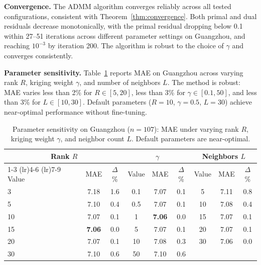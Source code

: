 \documentclass[journal]{IEEEtran}
\begin{document}
\textbf{Convergence.}
The ADMM algorithm converges reliably across all tested configurations, consistent with Theorem~\ref{thm:convergence}. Both primal and dual residuals decrease monotonically, with the primal residual dropping below 0.1 within 27--51 iterations across different parameter settings on Guangzhou, and reaching $10^{-3}$ by iteration 200. The algorithm is robust to the choice of $\gamma$ and converges consistently.

\textbf{Parameter sensitivity.}
Table~\ref{tab:sensitivity} reports MAE on Guangzhou across varying rank $R$, kriging weight $\gamma$, and number of neighbors $L$. The method is robust: MAE varies less than 2\% for $R \in [5, 20]$, less than 3\% for $\gamma \in [0.1, 50]$, and less than 3\% for $L \in [10, 30]$. Default parameters ($R = 10$, $\gamma = 0.5$, $L = 30$) achieve near-optimal performance without fine-tuning.

\begin{table}[htbp]
  \centering
  \caption{Parameter sensitivity on Guangzhou ($n{=}107$): MAE under varying rank $R$, kriging weight $\gamma$, and neighbor count $L$. Default parameters are near-optimal.}
  \label{tab:sensitivity}
  \small
  \setlength{\tabcolsep}{4pt}
  \begin{tabular}{lcccccccc}
    \toprule
    \multicolumn{3}{c}{Rank $R$} & \multicolumn{3}{c}{$\gamma$} & \multicolumn{3}{c}{Neighbors $L$} \\
    \cmidrule(lr){1-3} \cmidrule(lr){4-6} \cmidrule(lr){7-9}
    Value & MAE & $\Delta$\% & Value & MAE & $\Delta$\% & Value & MAE & $\Delta$\% \\
    \midrule
    3  & 7.18 & 1.6  & 0.1 & 7.07 & 0.1  & 5  & 7.11 & 0.8 \\
    5  & 7.10 & 0.4  & 0.5 & 7.07 & 0.1  & 10 & 7.08 & 0.4 \\
    10 & 7.07 & 0.1  & 1   & \textbf{7.06} & 0.0  & 15 & 7.07 & 0.1 \\
    15 & \textbf{7.06} & 0.0  & 5   & 7.07 & 0.1  & 20 & 7.07 & 0.1 \\
    20 & 7.07 & 0.1  & 10  & 7.08 & 0.3  & 30 & 7.06 & 0.0 \\
    30 & 7.10 & 0.6  & 50  & 7.10 & 0.6  &     &     &     \\
    \bottomrule
  \end{tabular}
\end{table}

\end{document}
